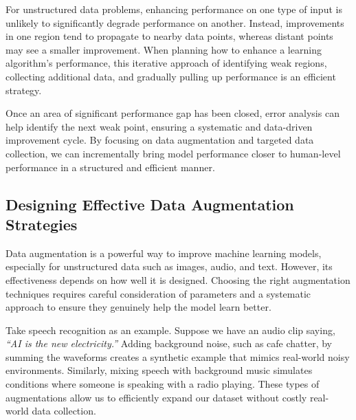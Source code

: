 \documentclass[12pt,openany]{book}
\begin{document}
For unstructured data problems, enhancing performance on one type of input is unlikely to significantly degrade performance on another. Instead, improvements in one region tend to propagate to nearby data points, whereas distant points may see a smaller improvement. When planning how to enhance a learning algorithm’s performance, this iterative approach of identifying weak regions, collecting additional data, and gradually pulling up performance is an efficient strategy. 
\newline

Once an area of significant performance gap has been closed, error analysis can help identify the next weak point, ensuring a systematic and data-driven improvement cycle. By focusing on data augmentation and targeted data collection, we can incrementally bring model performance closer to human-level performance in a structured and efficient manner.


\subsection{Designing Effective Data Augmentation Strategies}

Data augmentation is a powerful way to improve machine learning models, especially for unstructured data such as images, audio, and text. However, its effectiveness depends on how well it is designed. Choosing the right augmentation techniques requires careful consideration of parameters and a systematic approach to ensure they genuinely help the model learn better. \newline

Take speech recognition as an example. Suppose we have an audio clip saying, \textit{``AI is the new electricity.''} Adding background noise, such as cafe chatter, by summing the waveforms creates a synthetic example that mimics real-world noisy environments. Similarly, mixing speech with background music simulates conditions where someone is speaking with a radio playing. These types of augmentations allow us to efficiently expand our dataset without costly real-world data collection.
\end{document}
